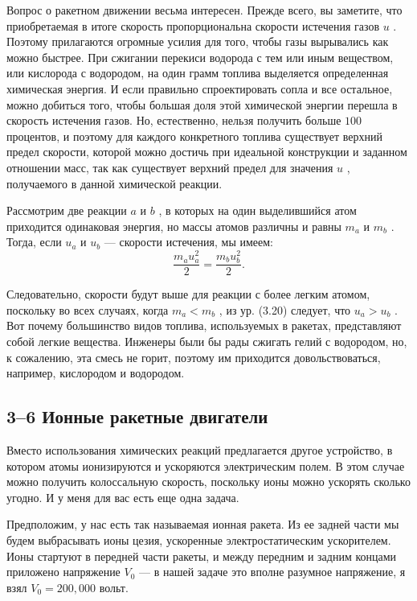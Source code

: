 \documentclass[11pt,oneside]{article}
\begin{document}
Вопрос о ракетном движении весьма интересен. Прежде всего, вы заметите, что приобретаемая в итоге скорость пропорциональна скорости истечения газов \(u\) . Поэтому прилагаются огромные усилия для того, чтобы газы вырывались как можно быстрее. При сжигании перекиси водорода с тем или иным веществом, или кислорода с водородом, на один грамм топлива выделяется определенная химическая энергия. И если правильно спроектировать сопла и все остальное, можно добиться того, чтобы большая доля этой химической энергии перешла в скорость истечения газов. Но, естественно, нельзя получить больше \(100\) процентов, и поэтому для каждого конкретного топлива существует верхний предел скорости, которой можно достичь при идеальной конструкции и заданном отношении масс, так как существует верхний предел для значения \(u\) , получаемого в данной химической реакции.\par

Рассмотрим две реакции \(a\) и \(b\) , в которых на один выделившийся атом приходится одинаковая энергия, но массы атомов различны и равны \(m_a\) и \(m_b\) . Тогда, если \(u_a\) и \(u_b\) --- скорости истечения, мы имеем: 
\begin{equation*} \tag{3.20}
\label{Eq:TIPS:3:20} \frac{m_a u_a^2}{2} = \frac{m_b u_b^2}{2}. \end{equation*}
\par

Следовательно, скорости будут выше для реакции с более легким атомом, поскольку во всех случаях, когда \(m_a < m_b\) , из ур. (3.20) следует, что \(u_a > u_b\) . Вот почему большинство видов топлива, используемых в ракетах, представляют собой легкие вещества. Инженеры были бы рады сжигать гелий с водородом, но, к сожалению, эта смесь не горит, поэтому им приходится довольствоваться, например, кислородом и водородом.\par

\subsection*{3--6 Ионные ракетные двигатели}

Вместо использования химических реакций предлагается другое устройство, в котором атомы ионизируются и ускоряются электрическим полем. В этом случае можно получить колоссальную скорость, поскольку ионы можно ускорять сколько угодно. И у меня для вас есть еще одна задача.\par

Предположим, у нас есть так называемая ионная ракета. Из ее задней части мы будем выбрасывать ионы цезия, ускоренные электростатическим ускорителем. Ионы стартуют в передней части ракеты, и между передним и задним концами приложено напряжение \(V_0\) --- в нашей задаче это вполне разумное напряжение, я взял \(V_0 = 200,\!000\) вольт.\par
\end{document}
